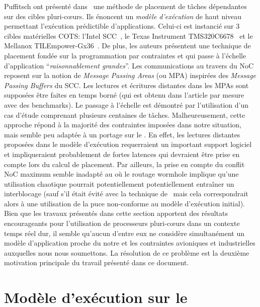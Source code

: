 \documentclass[main.tex]{subfiles}
\begin{document}
Puffitsch \etal ont présenté dans~\cite{PuffitschNP15} une méthode de placement de tâches dépendantes sur des cibles pluri-c\oe{}urs. Ils énoncent un \emph{modèle d'exécution} de haut niveau permettant l'exécution prédictible d'applications. Celui-ci est instancié sur 3 cibles matérielles COTS: l'Intel SCC~\cite{intel_scc}, le Texas Instrument TMS320C6678~\cite{TMS320C6678} et le Mellanox TILEmpower-Gx36~\cite{TileGx36}. De plus, les auteurs présentent une technique de placement fondée sur la programmation par contraintes et qui passe à l'échelle d'application ``\emph{raisonnablement grandes}''. Les communications au travers du NoC reposent sur la notion de \emph{Message Passing Areas} (ou MPA) inspirées des \emph{Message Passing Buffers} du SCC. Les lectures et écritures distantes dans les MPAs sont supposées être faites en temps borné (qui est obtenu dans l'article par mesure avec des benchmarks). Le passage à l'échelle est démontré par l'utilisation d'un cas d'étude comprenant plusieurs centaines de tâches. Malheureusement, cette approche répond à la majorité des contraintes imposées dans notre situation, mais semble peu adaptée à un portage sur le \mppalong. En effet, les lectures distantes proposées dans le modèle d'exécution requerraient un important support logiciel et impliqueraient probablement de fortes latences qui devraient être prise en compte lors du calcul de placement. Par ailleurs, la prise en compte du conflit NoC maximum semble inadapté au \mppalong où le routage wormhole implique qu'une utilisation chaotique pourrait potentiellement potentiellement entraîner un interblocage (sauf s'il était évité avec la technique de~\cite{Dinechin2014NoCArc} mais cela correspondrait alors à une utilisation de la puce non-conforme au modèle d'exécution initial). \\

Bien que les travaux présentés dans cette section apportent des résultats encourageants pour l'utilisation de processeurs pluri-c\oe{}urs dans un contexte temps réel dur, il semble qu'aucun d'entre eux ne considère simultanément un modèle d'application proche du notre et les contraintes avioniques et industrielles auxquelles nous nous soumettons. La résolution de ce problème est la deuxième motivation principale du travail présenté dans ce document.







\section{Modèle d'exécution sur le \mppalong}
\label{sec_resumeFr_execModel}
\end{document}

